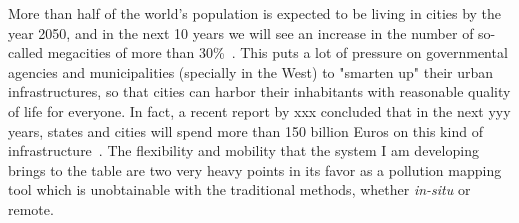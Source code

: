 More than half of the world's population is expected to be living in
cities by the year 2050, and in the next 10 years we will see an
increase in the number of so-called megacities of more than
30\%~\cite{CABI2019}. This puts a lot of pressure on governmental
agencies and municipalities (specially in the West) to "smarten up"
their urban infrastructures, so that cities can harbor their inhabitants
with reasonable quality of life for everyone. In fact, a recent report
by xxx concluded that in the next yyy years, states and cities will
spend more than 150 billion Euros on this kind of
infrastructure~. The flexibility and mobility
that the system I am developing brings to the table are two very heavy
points in its favor as a pollution mapping tool which is unobtainable
with the traditional methods, whether \emph{in-situ} or remote.
